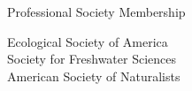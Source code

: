 \documentclass{resume} %
\begin{document}
\bigskip
\newpage
\begin{rSection}{Professional Society Membership}

Ecological Society of America\\
Society for Freshwater Sciences\\
American Society of Naturalists\\ 

\end{rSection}

% 
% 
% 
% 
\end{document}

